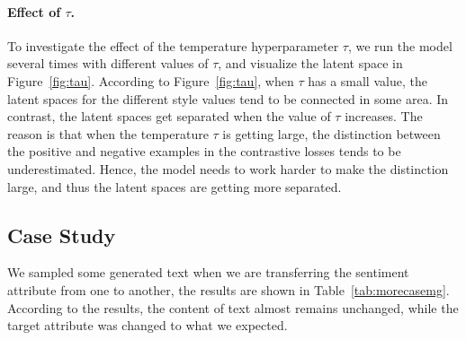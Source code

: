 \documentclass[11pt,a4paper]{article}
\begin{document}
\paragraph{Effect of $\tau$.}
To investigate the effect of the temperature hyperparameter $\tau$, we run the model several times with different values of $\tau$, and visualize the latent space in Figure~\ref{fig:tau}. According to Figure~\ref{fig:tau}, when $\tau$ has a small value, the latent spaces for the different style values tend to be connected in some area. In contrast, the latent spaces get separated when the value of $\tau$ increases. The reason is that when the temperature  $\tau$ is getting large, the distinction between the positive and negative examples in the contrastive losses tends to be underestimated. Hence, the model needs to work harder to make the distinction large, and thus the latent spaces are getting more separated. 




\subsection{Case Study} \label{sec:casestudy}
We sampled some generated text when we are transferring the sentiment attribute from one to another, the results  are shown in Table~\ref{tab:morecasemg}. According to the results, the content of text almost remains unchanged,  while the target attribute was changed to what we expected. 
\end{document}
